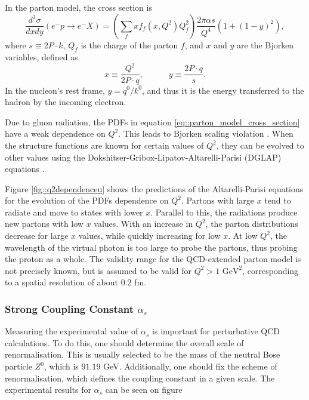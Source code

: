     In the parton model, the cross section is
    \begin{equation}
        \label{eq::parton_model_cross_section}
        \frac{d^2\sigma}{dxdy} \left( e^-p \rightarrow e^-X \right) =
                \left( \sum_f xf_f \left( x, Q^2 \right) Q_f^2 \right)
                \frac{2\pi\alpha s}{Q^4} \left( 1 + \left( 1 - y \right)^2 \right),
    \end{equation}
    where $s \equiv 2P\cdot k$, $Q_f$ is the charge of the parton $f$, and $x$ and $y$ are the Bjorken variables, defined as
    \begin{equation*}
        x \equiv \frac{Q^2}{2P\cdot q}, \hspace{36pt} y \equiv \frac{2 P\cdot q}{s}.
    \end{equation*}
    In the nucleon's rest frame, $y = q^0/k^0$, and thus it is the energy transferred to the hadron by the incoming electron.
    
    Due to gluon radiation, the PDFs in equation \eqref{eq::parton_model_cross_section} have a weak dependence on $Q^2$.
    This leads to Bjorken scaling violation \cite{halzen1991}.
    When the structure functions are known for certain values of $Q^2$, they can be evolved to other values using the Dokshitser-Gribox-Lipatov-Altarelli-Parisi (DGLAP) equations \cite{dokshitzer1991}.

    Figure \ref{fig::q2dependenceu} shows the predictions of the Altarelli-Parisi equations for the evolution of the PDFs dependence on $Q^2$.
    Partons with large $x$ tend to radiate and move to states with lower $x$.
    Parallel to this, the radiations produce new partons with low $x$ values.
    With an increase in $Q^2$, the parton distributions decrease for large $x$ values, while quickly increasing for low $x$.
    At low $Q^2$, the wavelength of the virtual photon is too large to probe the partons, thus probing the proton as a whole.
    The validity range for the QCD-extended parton model is not precisely known, but is assumed to be valid for $Q^2 > 1 \text{ GeV}^2$, corresponding to a spatial resolution of about $0.2$ fm.

    \subsubsection{Strong Coupling Constant $\alpha_s$}
        Measuring the experimental value of $\alpha_s$ is important for perturbative QCD calculations.
        To do this, one should determine the overall scale of renormalisation.
        This is usually selected to be the mass of the neutral Bose particle $Z^0$, which is $91.19$ GeV.
        Additionally, one should fix the scheme of renormalisation, which defines the coupling constant in a given scale.
        The experimental results for $\alpha_s$ can be seen on figure
        
